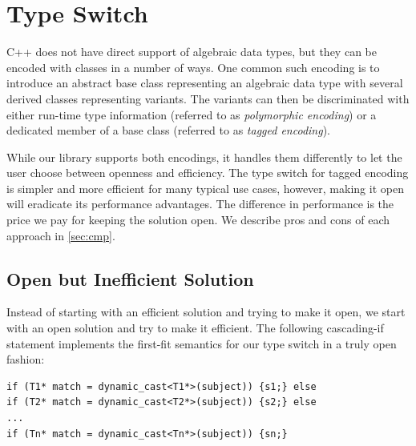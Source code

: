 \section{Type Switch}
\label{sec:copc}

C++ does not have direct support of algebraic data types, but they can be 
encoded with classes in a number of ways. One common such encoding is to 
introduce an abstract base class representing an algebraic data type with 
several derived classes representing variants. The variants can then be 
discriminated with either run-time type information (referred to as 
\emph{polymorphic encoding}) or a dedicated member of a base class 
(referred to  as \emph{tagged encoding}).

While our library supports both encodings, it handles them differently to let 
the user choose between openness and efficiency. The type switch for tagged 
encoding is simpler and more efficient for many typical use cases, however, 
making it open will eradicate its performance advantages. The difference in 
performance is the price we pay for keeping the solution open. We describe pros 
and cons of each approach in \textsection\ref{sec:cmp}.




\subsection{Open but Inefficient Solution}
\label{sec:poets}

Instead of starting with an efficient solution and trying to make it open, we 
start with an open solution and try to make it efficient. The following 
cascading-if statement implements the first-fit semantics for our type switch in 
a truly open fashion:

\begin{lstlisting}
if (T1* match = dynamic_cast<T1*>(subject)) {s1;} else
if (T2* match = dynamic_cast<T2*>(subject)) {s2;} else
...
if (Tn* match = dynamic_cast<Tn*>(subject)) {sn;}
\end{lstlisting}


